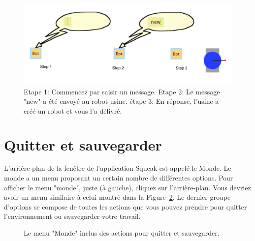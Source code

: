 \documentclass[a4paper,10pt,twoside]{book}
\begin{document}
\begin{figure}[!h]\centerline{\includegraphics[width=14cm]{15-creatingARobot2}}
\caption{Etape 1: Commencez par saisir un message. Etape 2: Le message "new" a \'et\'e envoy\'e au robot usine. \'etape 3: En r\'eponse, l'usine a cr\'e\'e un robot et vous l'a d\'elivr\'e. 
\label{fig:turtleBoxNew}}
\end{figure}





\section{Quitter et sauvegarder}

L'arri\`ere plan de la fen\^etre de l'application Squeak est appel\'e le Monde. Le monde a un menu proposant un certain nombre de diff\'erentes options. Pour afficher le menu "monde", juste (\`a gauche), cliquez sur l'arri\`ere-plan. Vous devriez avoir un menu similaire \`a celui montr\'e dans la Figure~\ref{fig:worldMenu}. Le dernier groupe d'options se compose de toutes les actions que vous pouvez prendre pour quitter l'environnement ou  sauvegarder votre travail. 


\begin{figure}[!h]
\caption{Le menu "Monde" inclus des actions pour quitter et sauvegarder.\label{fig:worldMenu}}
\end{figure}
\end{document}
